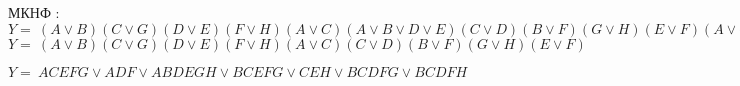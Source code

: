 МКНФ : $ Y = \
(A \vee B) (C \vee G) (D \vee E) (F \vee H) (A \vee C) (A \vee B \vee D \vee E) (C \vee D) (B \vee F) (G \vee H) (E \vee F) (A \vee C \vee D) (B \vee E \vee F)
$ \\

$ Y = \
(A \vee B) (C \vee G) (D \vee E) (F \vee H) (A \vee C) (C \vee D) (B \vee F) (G \vee H) (E \vee F) 
$

$ Y = \
ACEFG \vee ADF \vee ABDEGH \vee BCEFG \vee CEH \vee BCDFG \vee BCDFH \
$



